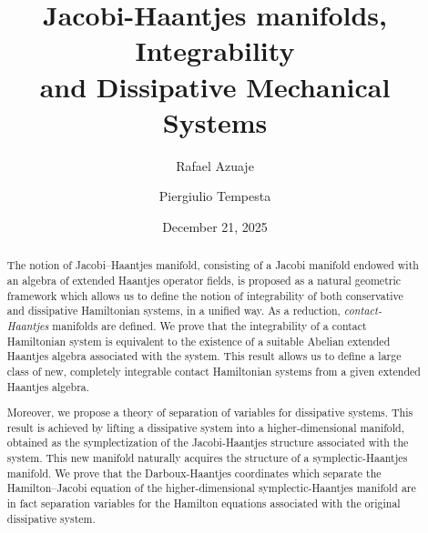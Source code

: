 \documentclass[10pt]{amsart}
\numberwithin{equation}{section}
\theoremstyle{definition}
\begin{document}
\author{Rafael Azuaje}
\address{Departamento de F\'isica, Universidad Aut\'onoma Metropolitana Unidad Iztapalapa,
San Rafael Atlixco 186, 09340, Ciudad de M\'exico, M\'exico}
\author{Piergiulio Tempesta}
\address{Departamento de F\'{\i}sica Te\'{o}rica, Facultad de Ciencias F\'{\i}sicas,
  Universidad Complutense de Madrid, 28040 -- Madrid, Spain \\ and Instituto de Ciencias
  Matem\'aticas, C/ Nicol\'as Cabrera, No 13--15, 28049 Madrid, Spain}


\title[Jacobi-Haantjes manifolds, Integrability and Dissipative Systems]{Jacobi-Haantjes manifolds, Integrability \\ and Dissipative Mechanical Systems}


\date{December 21, 2025}


\begin{abstract}
The notion of Jacobi--Haantjes manifold, consisting of a Jacobi manifold endowed with an algebra of extended Haantjes operator fields,  is proposed as a natural geometric framework which allows us to define the notion of integrability of both conservative and dissipative  Hamiltonian systems, in a unified way. As a reduction, \textit{contact-Haantjes} manifolds are defined.
We prove that the integrability of a contact Hamiltonian system is equivalent to the existence of a suitable Abelian extended Haantjes algebra associated with the system. This result allows us to define a large class of new, completely integrable contact Hamiltonian systems from a given extended Haantjes algebra.

Moreover, we propose a theory of separation of variables for dissipative systems. This result is achieved by lifting a dissipative system into a higher-dimensional manifold, obtained as the symplectization of the Jacobi-Haantjes structure associated with the system. This new manifold naturally acquires the structure of a symplectic-Haantjes manifold. We prove that the Darboux-Haantjes coordinates which separate the Hamilton--Jacobi equation of the higher-dimensional symplectic-Haantjes manifold are in fact separation variables for the Hamilton equations associated with the original dissipative system.
\end{abstract}

\maketitle
\end{document}
